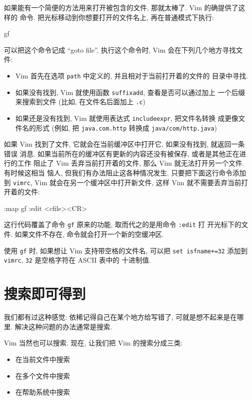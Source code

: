 如果能有一个简便的方法用来打开被包含的文件, 那就太棒了. Vim 的确提供了这样的
命令. 把光标移动到你想要打开的文件名上, 再在普通模式下执行:
\begin{vimcmd}
gf
\end{vimcmd}
可以把这个命令记成 ``goto file''. 执行这个命令时, Vim 会在下列几个地方寻找文件:
\begin{itemize}
    \item Vim 首先在选项 \texttt{path} 中定义的, 并且相对于当前打开着的文件的
        目录中寻找.
    \item 如果没有找到, Vim 就使用函数 \texttt{suffixadd}, 查看是否可以通过加上
        一个后缀来搜索到文件 (比如, 在文件名后面加上 \texttt{.c})
    \item 如果还是没有找到, Vim 就使用表达式 \texttt{includeexpr}, 把文件名转换
        成更像文件名的形式 (例如, 把 \texttt{java.com.http} 转换成
        \texttt{java/com/http.java})
\end{itemize}

如果 Vim 找到了文件, 它就会在当前缓冲区中打开它, 如果没有找到, 就返回一条错误
消息. 如果当前所在的缓冲区有更新的内容还没有被保存, 或者是其他正在进行的工作
阻止了 Vim 丢弃当前打开着的文件, 那么 Vim 就无法打开另一个文件. 有时候这相当
恼人, 但我们有办法阻止这各种情况发生. 只要把下面这行命令添加到 \texttt{vimrc},
Vim 就会在另一个缓冲区中打开新文件, 这样 Vim 就不需要丢弃当前打开着的文件:
\begin{vimcmd}
:map gf :edit <cfile><CR>
\end{vimcmd}
这行代码覆盖了命令 \texttt{gf} 原来的功能, 取而代之的是用命令 \texttt{:edit} 打
开光标下的文件. 如果文件不存在, 命令就会打开一个新的空缓冲区.

\begin{warning}
    使用 \texttt{gf} 时, 如果想让 Vim 支持带空格的文件名, 可以把 \texttt{set
    isfname+=32} 添加到 \texttt{vimrc}, \texttt{32} 是空格字符在 ASCII 表中的
    十进制值.
\end{warning}

\section{搜索即可得到}
\label{sec:search_and_you_will_find}

我们都有过这种感觉: 依稀记得自己在某个地方给写错了, 可就是想不起来是在哪里.
解决这种问题的办法通常是搜索.

Vim 当然也可以搜索. 现在, 让我们把 Vim 的搜索分成三类:
\begin{itemize}
    \item 在当前文件中搜索
    \item 在多个文件中搜索
    \item 在帮助系统中搜索
\end{itemize}

